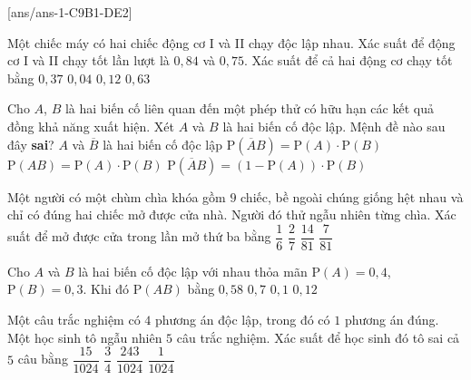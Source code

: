 [ans/ans-1-C9B1-DE2]
\caulc
\begin{ex}%
Một chiếc máy có hai chiếc động cơ I và II chạy độc lập nhau. Xác suất để động cơ I và II chạy tốt lần lượt là $0{,}84$ và $0{,}75$. Xác suất để cả hai động cơ chạy tốt bằng
	\choice
		{$0{,}37$}
		{$0{,}04$}
		{$0{,}12$}
		{\True $0{,}63$}
\end{ex}
\begin{ex}%
Cho $A$, $B$ là hai biến cố liên quan đến một phép thử có hữu hạn các kết quả đồng khả năng xuất hiện. Xét $A$ và $B$ là hai biến cố độc lập. Mệnh đề nào sau đây \textbf{sai}?
	\choice
		{$A$ và $\overline{B}$ là hai biến cố độc lập}
		{\True $\mathrm{P}\left(\overline{A}B\right)=\mathrm{P}(A)\cdot \mathrm{P}(B)$}
		{$\mathrm{P}(AB)=\mathrm{P}(A)\cdot \mathrm{P}(B)$}
		{$\mathrm{P}\left(\overline{A}B\right)=\left(1-\mathrm{P}(A)\right)\cdot \mathrm{P}(B)$}
\end{ex}
\begin{ex}%
Một người có một chùm chìa khóa gồm $9$ chiếc, bề ngoài chúng giống hệt nhau và chỉ có đúng hai chiếc mở được cửa nhà. Người đó thử ngẫu nhiên từng chìa. Xác suất để mở được cửa trong lần mở thứ ba bằng
	\choice
		{\True $\dfrac{1}{6}$}
		{$\dfrac{2}{7}$}
		{$\dfrac{14}{81}$}
		{$\dfrac{7}{81}$}
\end{ex}
\begin{ex}%
Cho $A$ và $B$ là hai biến cố độc lập với nhau thỏa mãn $\mathrm{P}(A)=0{,}4$, $\mathrm{P}(B)=0{,}3$. Khi đó $\mathrm{P}(AB)$ bằng
	\choice
		{$0{,}58$}
		{$0{,}7$}
		{$0{,}1$}
		{\True $0{,}12$}
\end{ex}
\begin{ex}%
Một câu trắc nghiệm có $4$ phương án độc lập, trong đó có $1$ phương án đúng. Một học sinh tô ngẫu nhiên $5$ câu trắc nghiệm. Xác suất để học sinh đó tô sai cả $5$ câu bằng
	\choice
		{$\dfrac{15}{1024}$}
		{$\dfrac{3}{4}$}
		{\True $\dfrac{243}{1024}$}
		{$\dfrac{1}{1024}$}
\end{ex}
